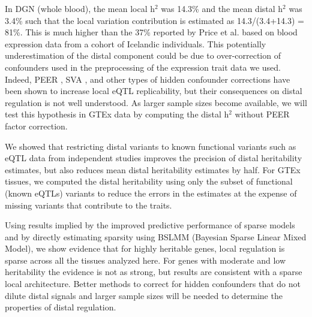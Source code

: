 \documentclass[10pt,letterpaper]{article}
\begin{document}
In DGN (whole blood), the mean local h$^2$ was 14.3\% and the mean distal h$^2$ was 3.4\% such that the local variation contribution is estimated as 14.3/(3.4+14.3) = 81\%. This is much higher than the 37\% reported by Price et al. \cite{Price_2011} based on blood expression data from a cohort of Icelandic individuals. This potentially underestimation of the distal component could be due to over-correction of confounders used in the preprocessing of the expression trait data we used. Indeed, PEER \cite{Stegle_2012}, SVA \cite{Leek_2007}, and other types of hidden confounder corrections have been shown to increase local eQTL replicability, but their consequences on distal regulation is not well understood.  As larger sample sizes become available, we will test this hypothesis in GTEx data by computing the distal h$^2$ without PEER factor correction.


We showed that restricting distal variants to known functional variants such as eQTL data from independent studies improves the precision of distal heritability estimates, but also reduces mean distal heritability estimates by half. For GTEx tissues, we computed the distal heritability using only the subset of functional (known eQTLs) variants to reduce the errors in the estimates at the expense of missing variants that contribute to the traits.

Using results implied by the improved predictive performance of sparse models and by directly estimating sparsity using BSLMM (Bayesian Sparse Linear Mixed Model), we show evidence that for highly heritable genes, local regulation is sparse across all the tissues analyzed here. For genes with moderate and low heritability the evidence is not as strong, but results are consistent with a sparse local architecture. Better methods to correct for hidden confounders that do not dilute distal signals and larger sample sizes will be needed to determine the properties of distal regulation. 
\end{document}
